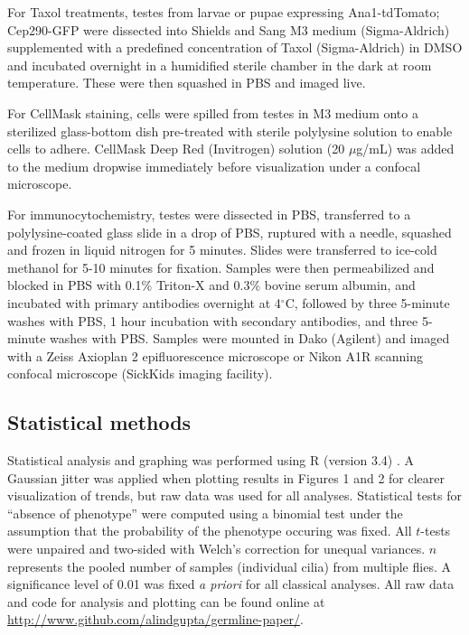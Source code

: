 \documentclass[12pt, twoside, letterpaper]{article}
\begin{document}
\begin{doublespacing}
\begin{linenumbers}
    For Taxol treatments, testes from larvae or pupae expressing
    Ana1-tdTomato; Cep290-GFP were
    dissected into Shields and Sang M3 medium (Sigma-Aldrich) supplemented
    with a predefined
    concentration of Taxol (Sigma-Aldrich) in DMSO
    and incubated overnight in a humidified sterile
    chamber in the dark at room temperature.
    These were then squashed in PBS and imaged live.

    For CellMask staining, cells were spilled from testes in M3 medium onto
    a sterilized glass-bottom dish pre-treated with sterile polylysine solution
    to enable cells to adhere.
    CellMask Deep Red (Invitrogen) solution (20 $\mu$g/mL) was added to the medium dropwise
    immediately before visualization under a confocal microscope.

    For immunocytochemistry, testes were dissected in PBS,
    transferred to a polylysine-coated glass slide in a drop of PBS,
    ruptured with a needle, squashed and frozen in liquid nitrogen for 5 minutes.
    Slides were transferred to ice-cold methanol for 5-10 minutes for fixation.
    Samples were then permeabilized and blocked in PBS with 0.1\% Triton-X and 0.3\% bovine
    serum albumin, and incubated with primary antibodies overnight at 4$^{\circ}$C,
    followed by three 5-minute washes with PBS, 1 hour incubation
    with secondary antibodies, and three 5-minute washes with PBS.
    Samples were mounted in Dako (Agilent) and imaged with
    a Zeiss Axioplan 2 epifluorescence microscope
    or Nikon A1R scanning confocal microscope (SickKids imaging facility).

    \subsection*{Statistical methods}
    Statistical analysis and graphing was performed using R (version 3.4)
    \citep{r}.
    A Gaussian jitter was applied when plotting
    results in Figures 1 and 2 for clearer visualization of trends,
    but raw data was used for all analyses.
    Statistical tests for ``absence of phenotype'' were computed using a binomial test
    under the assumption that the probability of the phenotype occuring was fixed.
    All $t$-tests were unpaired and two-sided with Welch's correction for unequal variances.
    $n$ represents the pooled number of samples (individual cilia) from multiple flies.
    A significance level of 0.01 was fixed \textit{a priori} for all classical analyses.
    All raw data and code for analysis and plotting can be found online
    at \url{http://www.github.com/alindgupta/germline-paper/}.


\end{linenumbers}
\end{doublespacing}
\end{document}
